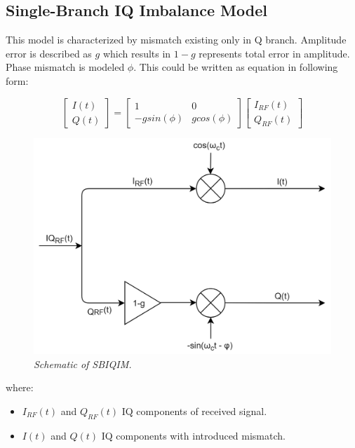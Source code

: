 \documentclass[en,printmode]{mgr}
\begin{document}
		\subsection*{Single-Branch IQ Imbalance Model}
			This model is characterized by mismatch existing only in Q branch. Amplitude error is
			described as $g$ which results in $1-g$ represents total error in amplitude. Phase mismatch
			is modeled $\phi$. This could be written as equation in following form:
			
		\begin{equation}
			\begin{bmatrix}
				I(t) \\
				Q(t)
			\end{bmatrix}
			=
			\begin{bmatrix}
				1 & 0 \\
				-g sin(\phi) & g cos(\phi)
			\end{bmatrix}
			\begin{bmatrix}
				I_{RF}(t) \\
				Q_{RF}(t)
			\end{bmatrix} \label{eq:SBIQIM}
		\end{equation}
		
		\begin{figure}[!htb]
    		\centering
   			\includegraphics[width=\textwidth]{diag/sbiq.png}
    		\caption{\textit{Schematic of SBIQIM.}}
		\end{figure}
		
		where:
		\begin{itemize}
			\item $I_{RF}(t)$ and $Q_{RF}(t)$ IQ components of received signal.
			\item $I(t)$ and $Q(t)$ IQ components with introduced mismatch.
		\end{itemize}
\end{document}
